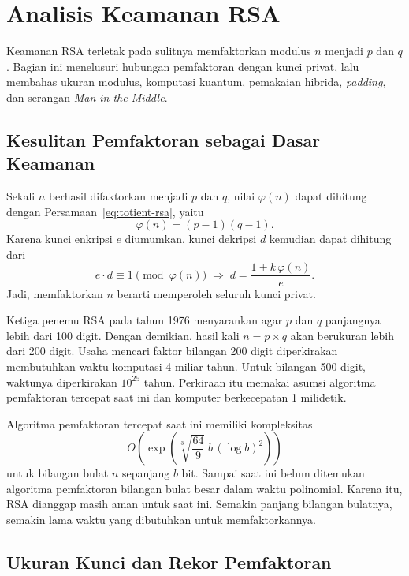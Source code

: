 \section{Analisis Keamanan RSA}
\label{sec:keamanan-rsa}

Keamanan RSA terletak pada sulitnya memfaktorkan modulus $n$ menjadi $p$ dan
$q$. Bagian ini menelusuri hubungan pemfaktoran dengan kunci privat, lalu
membahas ukuran modulus, komputasi kuantum, pemakaian hibrida, \textit{padding},
dan serangan \textit{Man-in-the-Middle}.

\subsection{Kesulitan Pemfaktoran sebagai Dasar Keamanan}
\label{subsec:kesulitan-pemfaktoran}

Sekali $n$ berhasil difaktorkan menjadi $p$ dan $q$, nilai $\varphi(n)$ dapat
dihitung dengan Persamaan~\eqref{eq:totient-rsa}, yaitu
\[
\varphi(n) = (p-1)(q-1).
\]
Karena kunci enkripsi $e$ diumumkan, kunci dekripsi $d$ kemudian dapat dihitung
dari
\begin{equation}
e \cdot d \equiv 1 \pmod{\varphi(n)}
\;\Longrightarrow\;
d = \frac{1 + k\,\varphi(n)}{e}.
\label{eq:serang-d}
\end{equation}
Jadi, memfaktorkan $n$ berarti memperoleh seluruh kunci privat.

Ketiga penemu RSA pada tahun 1976 menyarankan agar $p$ dan $q$ panjangnya
lebih dari 100 digit. Dengan demikian, hasil kali $n = p \times q$ akan
berukuran lebih dari 200 digit. Usaha mencari faktor bilangan 200 digit
diperkirakan membutuhkan waktu komputasi 4 miliar tahun. Untuk bilangan 500
digit, waktunya diperkirakan $10^{25}$ tahun. Perkiraan itu memakai asumsi
algoritma pemfaktoran tercepat saat ini dan komputer berkecepatan 1
milidetik.

Algoritma pemfaktoran tercepat saat ini memiliki kompleksitas
\begin{equation}
O\!\left(\exp\!\left(\sqrt[3]{\frac{64}{9}}\; b\,(\log b)^2\right)\right)
\label{eq:gnfs}
\end{equation}
untuk bilangan bulat $n$ sepanjang $b$ bit. Sampai saat ini belum ditemukan
algoritma pemfaktoran bilangan bulat besar dalam waktu polinomial. Karena itu,
RSA dianggap masih aman untuk saat ini. Semakin panjang bilangan bulatnya,
semakin lama waktu yang dibutuhkan untuk memfaktorkannya.

\subsection{Ukuran Kunci dan Rekor Pemfaktoran}


